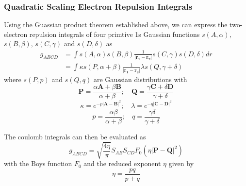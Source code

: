 \subsubsection{Quadratic Scaling Electron Repulsion Integrals} 

Using the Guassian product theorem established above, we can express the two-electron repulsion integrals of four primtive 1s Gaussian functions $s(A,\alpha)$, $s(B,\beta)$, $s(C,\gamma)$ and $s(D,\delta)$ as
\begin{equation}
\begin{split}
g_{ABCD} &= \int s(A,\alpha) s(B,\beta) \frac{1}{\left\lvert \mathbf{r_1} - \mathbf{r_2} \right\rvert} s(C,\gamma) s(D,\delta) dr \\
&= \int \kappa s(P, \alpha+\beta) \frac{1}{\left\lvert \mathbf{r_1} - \mathbf{r_2} \right\rvert} \lambda s(Q, \gamma+\delta)
\end{split}
\end{equation}
\noindent where $s(P,p)$ and $s(Q,q)$ are Gaussian distributions with
\begin{equation}
\mathbf{P} = \frac{\alpha \mathbf{A} + \beta \mathbf{B}}{\alpha + \beta} ; \quad \mathbf{Q} = \frac{\gamma \mathbf{C} + \delta \mathbf{D}}{\gamma + \delta}
\end{equation}
\begin{equation}
\kappa = e^{-p\left\lvert \mathbf{A} - \mathbf{B} \right\rvert^2} ; \quad \lambda = e^{-q\left\lvert \mathbf{C} - \mathbf{D} \right\rvert^2}
\end{equation}
\begin{equation}
p = \frac{\alpha\beta}{\alpha+\beta}; \quad q = \frac{\gamma\delta}{\gamma+\delta}
\end{equation}

\noindent The coulomb integrals can then be evaluated as 
\begin{equation}
g_{ABCD} = \sqrt{\frac{4 \eta}{\pi}} S_{AB} S_{CD} F_0\left(\eta \left\lvert \mathbf{P} - \mathbf{Q} \right\rvert^2 \right)
\end{equation}
\noindent with the Boys function $F_0$ and the reduced exponent $\eta$ given by
\begin{equation}
\eta = \frac{pq}{p+q}
\end{equation}

